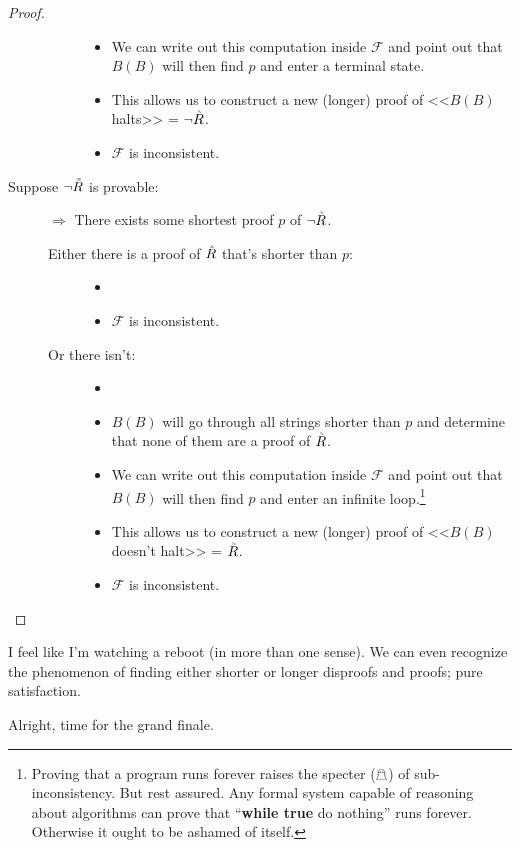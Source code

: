 \documentclass{article}
\theoremstyle{customstyle}
\newcommand{\F}{\ensuremath{\mathcal{F}}}
\newcommand{\iRosser}{\ensuremath{\accentset{\scalebox{0.35}{$\infty$}}{R}}}
\begin{document}
\begin{proof}
\begin{description}
\begin{description}
\begin{itemize}
\item We can write out this computation inside $\F$ and point out that $B(B)$ will then find $p$ and enter a terminal state.
\item This allows us to construct a new (longer) proof of <<$B(B)$ halts>> = $\neg \iRosser$.
\item $\F$ is inconsistent. \lightning
\end{itemize}
\end{description}
\item[Suppose $\neg \iRosser$ is provable:]
$\Rightarrow$ There exists some shortest proof $p$ of $\neg \iRosser$.
\begin{description}
\item[Either there is a proof of $\iRosser$ that's shorter than $p$:]
\begin{itemize}
\item[]
\item $\F$ is inconsistent. \lightning
\end{itemize}
\item[Or there isn't:]
\begin{itemize}
\item[]
\item $B(B)$ will go through all strings shorter than $p$ and determine that none of them are a proof of $\iRosser$.
\item We can write out this computation inside $\F$ and point out that $B(B)$ will then find $p$ and enter an infinite loop.\footnote{Proving that a program runs forever raises the specter ($\mathghost$) of sub-inconsistency. But rest assured. Any formal system capable of reasoning about algorithms can prove that ``\textbf{while true} do nothing'' runs forever. Otherwise it ought to be ashamed of itself.}
\item This allows us to construct a new (longer) proof of <<$B(B)$ doesn't halt>> = $\iRosser$.
\item $\F$ is inconsistent. \lightning\qedhere
\end{itemize}
\end{description}
\end{description}
\end{proof}

I feel like I'm watching a reboot (in more than one sense). We can even recognize the phenomenon of finding either shorter or longer disproofs and proofs; pure satisfaction.

Alright, time for the grand finale.
\end{document}
